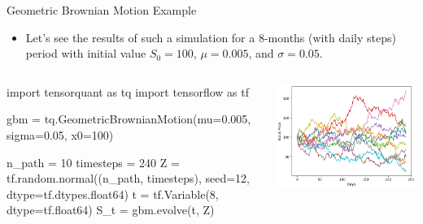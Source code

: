 \documentclass{beamer}
\begin{document}
\begin{frame}[fragile]{Geometric Brownian Motion Example}
\begin{itemize}
    \item Let's see the results of such a simulation for a 8-months (with daily steps) period with initial value $S_0=100$, $\mu=0.005$, and $\sigma=0.05$.
\end{itemize}

\begin{columns}
\begin{ipython}
import tensorquant as tq
import tensorflow as tf

gbm = tq.GeometricBrownianMotion(mu=0.005, sigma=0.05, x0=100)

n_path = 10
timesteps = 240
Z = tf.random.normal((n_path, timesteps), seed=12, 
                     dtype=tf.dtypes.float64)
t = tf.Variable(8, dtype=tf.float64)
S_t = gbm.evolve(t, Z)    
\end{ipython}
\begin{center}    
    \includegraphics[width=1.1\linewidth]{images/gbm_realizations}
\end{center}
\end{columns}
\end{frame}
\end{document}
